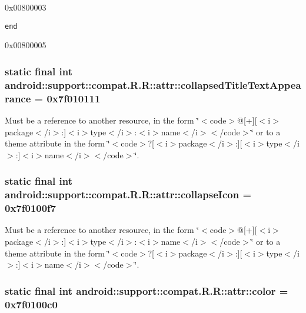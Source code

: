 0x00800003

{\tt end}

0x00800005\hypertarget{classandroid_1_1support_1_1compat_1_1_r_1_1attr_47760b80f4c14408f834d85904cf11a6}{
\subsubsection[{collapsedTitleTextAppearance}]{\setlength{\rightskip}{0pt plus 5cm}static final int android::support::compat.R.R::attr::collapsedTitleTextAppearance = 0x7f010111}}
\label{classandroid_1_1support_1_1compat_1_1_r_1_1attr_47760b80f4c14408f834d85904cf11a6}


Must be a reference to another resource, in the form \char`\"{}$<$code$>$@\mbox{[}+\mbox{]}\mbox{[}$<$i$>$package$<$/i$>$:\mbox{]}$<$i$>$type$<$/i$>$:$<$i$>$name$<$/i$>$$<$/code$>$\char`\"{} or to a theme attribute in the form \char`\"{}$<$code$>$?\mbox{[}$<$i$>$package$<$/i$>$:\mbox{]}\mbox{[}$<$i$>$type$<$/i$>$:\mbox{]}$<$i$>$name$<$/i$>$$<$/code$>$\char`\"{}. \hypertarget{classandroid_1_1support_1_1compat_1_1_r_1_1attr_194bfcaa2e2e52f391e35d1f97976b79}{
\subsubsection[{collapseIcon}]{\setlength{\rightskip}{0pt plus 5cm}static final int android::support::compat.R.R::attr::collapseIcon = 0x7f0100f7}}
\label{classandroid_1_1support_1_1compat_1_1_r_1_1attr_194bfcaa2e2e52f391e35d1f97976b79}


Must be a reference to another resource, in the form \char`\"{}$<$code$>$@\mbox{[}+\mbox{]}\mbox{[}$<$i$>$package$<$/i$>$:\mbox{]}$<$i$>$type$<$/i$>$:$<$i$>$name$<$/i$>$$<$/code$>$\char`\"{} or to a theme attribute in the form \char`\"{}$<$code$>$?\mbox{[}$<$i$>$package$<$/i$>$:\mbox{]}\mbox{[}$<$i$>$type$<$/i$>$:\mbox{]}$<$i$>$name$<$/i$>$$<$/code$>$\char`\"{}. \hypertarget{classandroid_1_1support_1_1compat_1_1_r_1_1attr_2036d81516ff177dc3e474b73e843315}{
\subsubsection[{color}]{\setlength{\rightskip}{0pt plus 5cm}static final int android::support::compat.R.R::attr::color = 0x7f0100c0}}
\label{classandroid_1_1support_1_1compat_1_1_r_1_1attr_2036d81516ff177dc3e474b73e843315}


